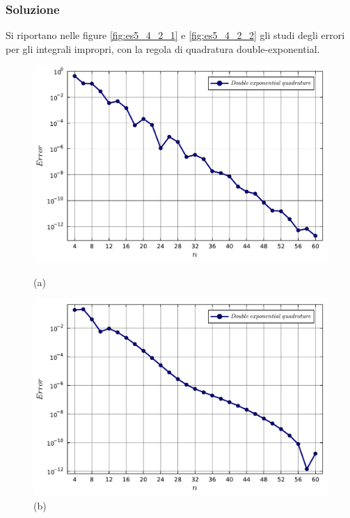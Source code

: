 \documentclass[letterpaper, 12pt]{article}
\begin{document}
\subsubsection{Soluzione}
Si riportano nelle figure \ref{fig:es5_4_2_1} e \ref{fig:es5_4_2_2} gli studi degli errori per gli integrali 
impropri, con la regola di quadratura double-exponential.
\begin{figure}[!ht]
    \centering
    \begin{minipage}[b]{0.47\textwidth}
        \includegraphics[width=\textwidth]{5421.pdf}
        \caption*{(a)}
    \end{minipage}
    \hspace{0.5cm}
    \begin{minipage}[b]{0.47\textwidth}
        \includegraphics[width=\textwidth]{5422.pdf}
        \caption*{(b)}
    \end{minipage}
    \begin{minipage}[b]{0.47\textwidth}

\end{minipage}
\end{figure}
\end{document}
